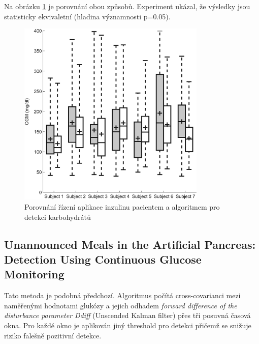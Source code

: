 Na obrázku \ref{fig:turksoy2} je porovnání obou způsobů. Experiment ukázal, že výsledky jsou statisticky ekvivaletní (hladina významnosti p=0.05).

\begin{figure}[H]
\caption{Porovnání řízení aplikace inzulinu pacientem a algoritmem pro detekci karbohydrátů}
\label{fig:turksoy2}
\centering
\includegraphics[width=0.8\textwidth]{img/analyza/turksoy3.jpg}
\end{figure}


\subsection{Unannounced Meals in the Artificial Pancreas: Detection Using Continuous Glucose Monitoring \citep{Analyza.CrossCovariance}}
\label{ch:CrossCovariance}

Tato metoda je podobná předchozí. Algoritmus počítá cross-covarianci mezi naměřenými hodnotami glukózy a jejich odhadem \textit{forward difference of the disturbance parameter Ddiff} (Unscended Kalman filter) přes tři posuvná časová okna. Pro každé okno je aplikován jiný threshold pro detekci přičemž se snižuje riziko falešně pozitivní detekce.

